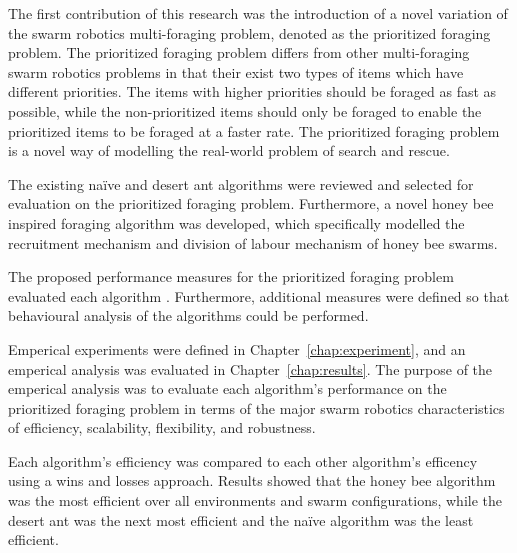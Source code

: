 The first contribution of this research was the introduction of a novel variation of the swarm robotics multi-foraging problem, denoted as the prioritized foraging problem. The prioritized foraging problem differs from other multi-foraging swarm robotics problems in that their exist two types of items which have different priorities. The items with higher priorities should be foraged as fast as possible, while the non-prioritized items should only be foraged to enable the prioritized items to be foraged at a faster rate. The prioritized foraging problem is a novel way of modelling the real-world problem of search and rescue.  

The existing na\"ive and desert ant algorithms were reviewed and selected for evaluation on the prioritized foraging problem. Furthermore, a novel honey bee inspired foraging algorithm was developed, which specifically modelled the recruitment mechanism and division of labour mechanism of honey bee swarms.

The proposed performance measures for the prioritized foraging problem evaluated each algorithm . Furthermore, additional measures were defined so that behavioural analysis of the algorithms could be performed. 

Emperical experiments were defined in Chapter~\ref{chap:experiment}, and an emperical analysis was evaluated in Chapter~\ref{chap:results}. The purpose of the emperical analysis was to evaluate each algorithm's performance on the prioritized foraging problem in terms of the major swarm robotics characteristics of efficiency, scalability, flexibility, and robustness. 

Each algorithm's efficiency was compared to each other algorithm's efficency using a wins and losses approach. Results showed that the honey bee algorithm was the most efficient over all environments and swarm configurations, while the desert ant was the next most efficient and the na\"ive algorithm was the least efficient.


